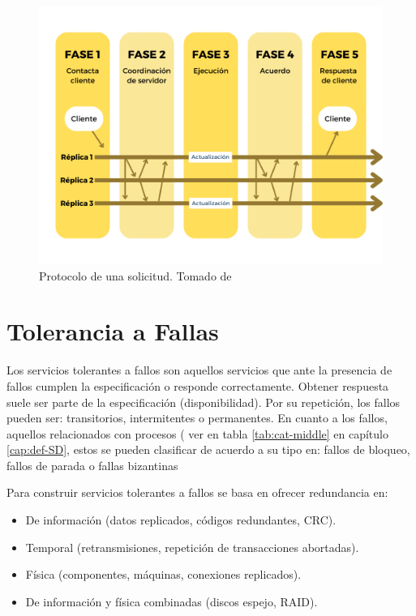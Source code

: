  \begin{figure}  
 	  \begin{center}%
 \includegraphics[width=0.8\linewidth]{9/3.png} 
 \caption{Protocolo de una solicitud. Tomado de \cite{Pedone2000}}
 \label{fig:protocol-sol}
 \end{center}  
\end{figure}
 
 \section{Tolerancia a Fallas}
   
   Los servicios tolerantes a fallos son aquellos servicios que ante la  presencia de fallos cumplen la especificación  o responde correctamente.
   Obtener respuesta suele ser parte de la especificación (disponibilidad).
   Por su repetición, los fallos pueden ser:   transitorios,  intermitentes o permanentes.
   En cuanto a los fallos, aquellos relacionados con procesos ( ver en tabla \ref{tab:cat-middle} en cap\'itulo \ref{cap:def-SD}, estos se pueden clasificar de acuerdo a su  tipo en:  fallos de bloqueo,   fallos de parada o  fallas bizantinas
   
   
   Para construir servicios tolerantes a fallos se basa en ofrecer redundancia en:
   \begin{itemize}
   	\item De información (datos replicados, códigos redundantes, CRC).
   	 \item Temporal (retransmisiones, repetición de transacciones abortadas).
   	 \item Física (componentes, máquinas, conexiones replicados).
   	  \item De información y física combinadas (discos espejo, RAID).
   \end{itemize}
   
